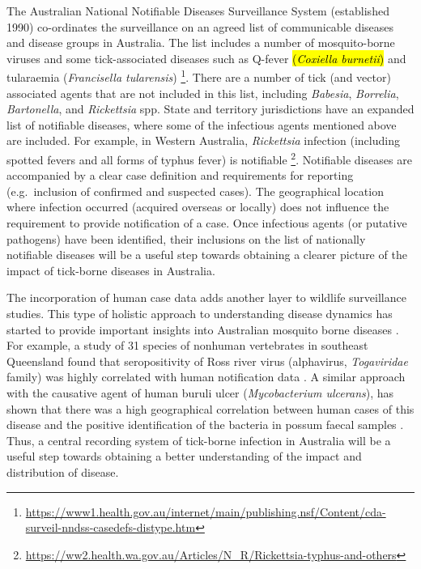 \documentclass[a4paper, nobind]{templates/ociamthesis}
\begin{document}
The Australian National Notifiable Diseases Surveillance System (established 1990) co-ordinates the surveillance on an agreed list of communicable diseases and disease groups in Australia.
The list includes a number of mosquito-borne viruses and some tick-associated diseases such as Q-fever \hl{(\emph{Coxiella burnetii})} and tularaemia (\emph{Francisella tularensis}) \footnote{\url{https://www1.health.gov.au/internet/main/publishing.nsf/Content/cda-surveil-nndss-casedefs-distype.htm}}.
There are a number of tick (and vector) associated agents that are not included in this list, including \emph{Babesia}, \emph{Borrelia}, \emph{Bartonella}, and \emph{Rickettsia} spp.
State and territory jurisdictions have an expanded list of notifiable diseases, where some of the infectious agents mentioned above are included.
For example, in Western Australia, \emph{Rickettsia} infection (including spotted fevers and all forms of typhus fever) is notifiable \footnote{\url{https://ww2.health.wa.gov.au/Articles/N_R/Rickettsia-typhus-and-others}}.
Notifiable diseases are accompanied by a clear case definition and requirements for reporting (e.g.~inclusion of confirmed and suspected cases).
The geographical location where infection occurred (acquired overseas or locally) does not influence the requirement to provide notification of a case.
Once infectious agents (or putative pathogens) have been identified, their inclusions on the list of nationally notifiable diseases will be a useful step towards obtaining a clearer picture of the impact of tick-borne diseases in Australia.

The incorporation of human case data adds another layer to wildlife surveillance studies.
This type of holistic approach to understanding disease dynamics has started to provide important insights into Australian mosquito borne diseases \autocite{ongMosquitoBorneVirusesNonHuman2021}.
For example, a study of 31 species of nonhuman vertebrates in southeast Queensland found that seropositivity of Ross river virus (alphavirus, \emph{Togaviridae} family) was highly correlated with human notification data \autocite{skinnerSpeciesTraitsHotspots2020}.
A similar approach with the causative agent of human buruli ulcer (\emph{Mycobacterium ulcerans}), has shown that there was a high geographical correlation between human cases of this disease and the positive identification of the bacteria in possum faecal samples \autocite{carsonPotentialWildlifeSentinels2014}.
Thus, a central recording system of tick-borne infection in Australia will be a useful step towards obtaining a better understanding of the impact and distribution of disease.
\end{document}
